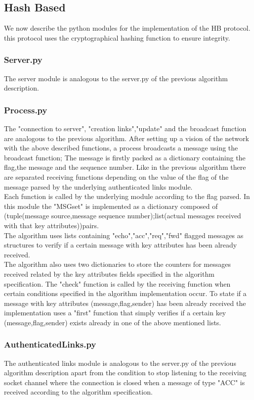\documentclass[12pt]{article}
\begin{document}
\subsection{Hash Based}
We now describe the python modules for the implementation of the HB protocol. this protocol uses the cryptographical hashing function to ensure integrity. \\ 
\subsubsection{Server.py}
The server module is analogous to the server.py of the previous algorithm description.
\subsubsection{Process.py}
The "connection to server", "creation links","update" and the broadcast function are analogous to the previous algorithm. After setting up a vision of the network with the above described functions, a process broadcasts a message using the broadcast function; The message is firstly packed as a dictionary containing the flag,the message and the sequence number. Like in the previous algorithm there are separated receiving functions depending on the value of the flag of the message parsed by the underlying authenticated links module.\\ Each function is called by the underlying module according to the flag parsed. In this module the "MSGset" is implemented as a dictionary composed of (tuple(message source,message sequence number);list(actual messages received with that key attributes))pairs.\\
The algorithm uses lists containing "echo","acc","req","fwd" flagged messages as structures to verify if a certain message with key attributes has been already received.\\
The algorithm also uses two dictionaries to store the counters for messages received related by the key attributes fields specified in the algorithm specification. The "check" function is called by the receiving function when certain conditions specified in the algorithm implementation occur. To state if a message with key attributes (message,flag,sender) has been already received the implementation uses a "first" function that simply verifies if a certain key (message,flag,sender) exists already in one of the above mentioned lists. \\
\subsubsection{AuthenticatedLinks.py}
The authenticated links module is analogous to the server.py of the previous algorithm description apart from the condition to stop listening to the receiving socket channel where the connection is closed when a message of type "ACC" is received according to the algorithm specification. \\
\\
\end{document}

